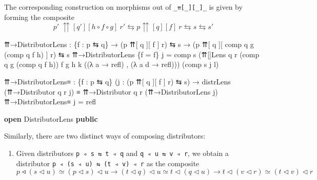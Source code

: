 \documentclass[
  11pt,
  oneside,
  article]{memoir}
\newenvironment{Shaded}{}{}
\newcommand{\KeywordTok}[1]{\textcolor[rgb]{0.00,0.44,0.13}{\textbf{#1}}}
\newcommand{\NormalTok}[1]{#1}
\newcommand{\OtherTok}[1]{\textcolor[rgb]{0.00,0.44,0.13}{#1}}
\providecommand{\tightlist}{%
  \setlength{\itemsep}{0pt}\setlength{\parskip}{0pt}}
\theoremstyle{definition}
\theoremstyle{plain}
\newcommand{\0}{\textsf{0}}
\newcommand{\1}{\tn{\textsf{1}}}
\begin{document}
The corresponding construction on morphisms out of
\texttt{\_⇈{[}\_{]}{[}\_{]}\_} is given by forming the composite \[
p' ~ {\upuparrows}[q'][h \circ f \circ g] ~ r' \leftrightarrows p {\upuparrows}[q][f] ~ r \leftrightarrows s \leftrightarrows s'
\]

\begin{Shaded}
\begin{Highlighting}[]
\NormalTok{    ⇈→DistributorLens }\OtherTok{:} 
        \OtherTok{\{}\NormalTok{f }\OtherTok{:}\NormalTok{ p ⇆ q}\OtherTok{\}} \OtherTok{→} \OtherTok{(}\NormalTok{p ⇈[ q ][ f ] r}\OtherTok{)}\NormalTok{ ⇆ s }
        \OtherTok{→} \OtherTok{(}\NormalTok{p\textquotesingle{} ⇈[ q\textquotesingle{} ][ comp q\textquotesingle{} g }\OtherTok{(}\NormalTok{comp q\textquotesingle{} f h}\OtherTok{)}\NormalTok{ ] r\textquotesingle{}}\OtherTok{)}\NormalTok{ ⇆ s\textquotesingle{}}
\NormalTok{    ⇈→DistributorLens }\OtherTok{\{}\NormalTok{f }\OtherTok{=}\NormalTok{ f}\OtherTok{\}}\NormalTok{ j }\OtherTok{=} 
\NormalTok{        comp s\textquotesingle{} }\OtherTok{(}\NormalTok{⇈[]Lens q\textquotesingle{} r }\OtherTok{(}\NormalTok{comp q\textquotesingle{} g }\OtherTok{(}\NormalTok{comp q\textquotesingle{} f h}\OtherTok{))}\NormalTok{ f }
\NormalTok{                         g h k }\OtherTok{((λ}\NormalTok{ a }\OtherTok{→}\NormalTok{ refl}\OtherTok{)}\NormalTok{ , }\OtherTok{(λ}\NormalTok{ a d }\OtherTok{→}\NormalTok{ refl}\OtherTok{)))} 
             \OtherTok{(}\NormalTok{comp s\textquotesingle{} j l}\OtherTok{)}

\NormalTok{    ⇈→DistributorLens≡ }\OtherTok{:} \OtherTok{\{}\NormalTok{f }\OtherTok{:}\NormalTok{ p ⇆ q}\OtherTok{\}} \OtherTok{(}\NormalTok{j }\OtherTok{:} \OtherTok{(}\NormalTok{p ⇈[ q ][ f ] r}\OtherTok{)}\NormalTok{ ⇆ s}\OtherTok{)}
                         \OtherTok{→}\NormalTok{ distrLens }\OtherTok{(}\NormalTok{⇈→Distributor q r j}\OtherTok{)} 
\NormalTok{                           ≡ ⇈→Distributor q\textquotesingle{} r\textquotesingle{} }\OtherTok{(}\NormalTok{⇈→DistributorLens j}\OtherTok{)}
\NormalTok{    ⇈→DistributorLens≡ j }\OtherTok{=}\NormalTok{ refl}

\KeywordTok{open}\NormalTok{ DistributorLens }\KeywordTok{public}
\end{Highlighting}
\end{Shaded}

Similarly, there are two distinct ways of composing distributors:

\begin{enumerate}
\def\labelenumi{\arabic{enumi}.}
\tightlist
\item
  Given distributors \texttt{p\ ◃\ s\ ⇆\ t\ ◃\ q} and
  \texttt{q\ ◃\ u\ ⇆\ v\ ◃\ r}, we obtain a distributor
  \texttt{p\ ◃\ (s\ ◃\ u)\ ⇆\ (t\ ◃\ v)\ ◃\ r} as the composite \[
  p ◃ (s \triangleleft u) \simeq (p \triangleleft s) \triangleleft u \xrightarrow{} (t \triangleleft q) \triangleleft u \simeq t \triangleleft (q \triangleleft u) \xrightarrow{} t \triangleleft (v \triangleleft r) \simeq (t \triangleleft v) \triangleleft r
  \]
\end{enumerate}
\end{document}
